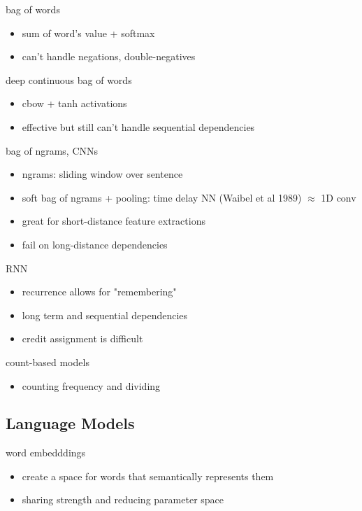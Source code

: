 \documentclass[]{article}
\theoremstyle{definition}
\begin{document}
    bag of words
    \begin{itemize}
        \item sum of word's value + softmax
        \item can't handle negations, double-negatives
    \end{itemize}

    deep continuous bag of words
    \begin{itemize}
        \item cbow + tanh activations
        \item effective but still can't handle sequential dependencies
    \end{itemize}

    bag of ngrams, CNNs
    \begin{itemize}
        \item ngrams: sliding window over sentence
        \item soft bag of ngrams + pooling: time delay NN (Waibel et al 1989) $\approx$ 1D conv
        \item great for short-distance feature extractions
        \item fail on long-distance dependencies
    \end{itemize}

    RNN
    \begin{itemize}
        \item recurrence allows for "remembering"
        \item long term and sequential dependencies
        \item credit assignment is difficult
    \end{itemize}

    count-based models
    \begin{itemize}
        \item counting frequency and dividing
    \end{itemize}

    \subsection{Language Models}%
    \label{sub:stuff}

    word embedddings
    \begin{itemize}
        \item create a space for words that semantically represents them
        \item sharing strength and reducing parameter space
    \end{itemize}
\end{document}
